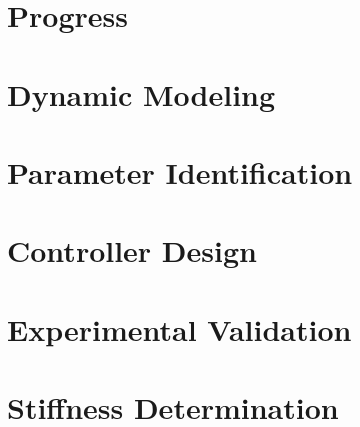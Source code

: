 \documentclass[12pt,twoside]{report}
\begin{document}

\thispagestyle{empty}



%

\tableofcontents

%






\chapter{Progress}


%

\chapter{Dynamic Modeling}


\chapter{Parameter Identification}



\chapter{Controller Design}



\chapter{Experimental Validation}





%




\newpage


\cleardoublepage

\appendix
\chapter{Stiffness Determination}

\end{document}
